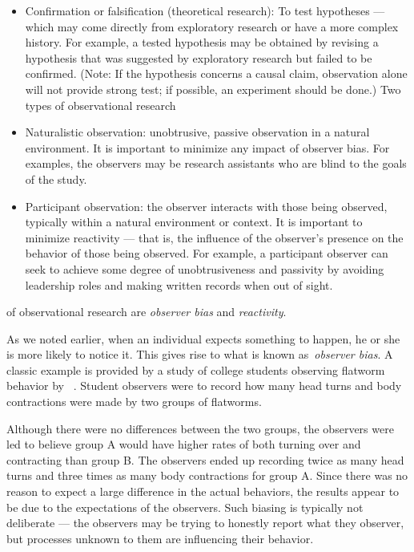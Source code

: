\begin{refsection}
\begin{itemize}
\item Confirmation or falsification (theoretical research): To test hypotheses — which may come directly from exploratory research or have a more complex history. For example, a tested hypothesis may be obtained by revising a hypothesis that was suggested by exploratory research but failed to be confirmed. (Note: If the hypothesis concerns a causal claim, observation alone will not provide strong test; if possible, an experiment should be done.)
Two types of observational research

\item Naturalistic observation: unobtrusive, passive observation in a natural environment. It is important to minimize any impact of observer bias. For examples, the observers may be research assistants who are blind to the goals of the study.

\item Participant observation: the observer interacts with those being observed, typically within a natural environment or context. It is important to minimize reactivity — that is, the influence of the observer's presence on the behavior of those being observed. For example, a participant observer can seek to achieve some degree of unobtrusiveness and passivity by avoiding leadership roles and making written records when out of sight.

\end{itemize}

 of observational research are \emph{observer bias} and \emph{reactivity}.

As we noted earlier, when an individual expects something to happen, he or she is more likely to notice it. This gives rise to what is known as \emph{observer bias}. A classic example is provided by a study of college students observing flatworm behavior by ~\citep{Cordaro:2016bv}. Student observers were to record how many head turns and body contractions were made by two groups of flatworms. 

Although there were no differences between the two groups, the observers were led to believe group A would have higher rates of both turning over and contracting than group B. The observers ended up recording twice as many head turns and three times as many body contractions for group A. Since there was no reason to expect a large difference in the actual behaviors, the results appear to be due to the expectations of the observers. Such biasing is typically not deliberate — the observers may be trying to honestly report what they observer, but processes unknown to them are influencing their behavior.


\end{refsection}
